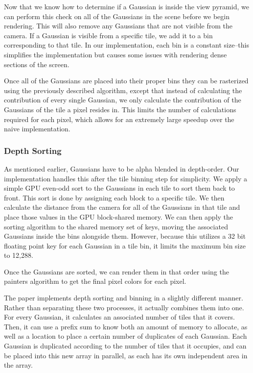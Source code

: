 \documentclass[12pt, a4paper, twocolumn]{article}
\begin{document}
Now that we know how to determine if a Gaussian is inside the view pyramid, we can perform this check on all of the Gaussians in the scene before we begin rendering. This will also remove any Gaussians that are not visible from the camera. If a Gaussian is visible from a specific tile, we add it to a bin corresponding to that tile. In our implementation, each bin is a constant size--this simplifies the implementation but causes some issues with rendering dense sections of the screen. 

Once all of the Gaussians are placed into their proper bins they can be rasterized using the previously described algorithm, except that instead of calculating the contribution of every single Gaussian, we only calculate the contribution of the Gaussians of the tile a pixel resides in. This limits the number of calculations required for each pixel, which allows for an extremely large speedup over the naive implementation.

\subsubsection{Depth Sorting}

As mentioned earlier, Gaussians have to be alpha blended in depth-order. Our implementation handles this after the tile binning step for simplicity. We apply a simple GPU even-odd sort to the Gaussians in each tile to sort them back to front. This sort is done by assigning each block to a specific tile. We then calculate the distance from the camera for all of the Gaussians in that tile and place those values in the GPU block-shared memory. We can then apply the sorting algorithm to the shared memory set of keys, moving the associated Gaussians inside the bins alongside them. However, because this utilizes a 32 bit floating point key for each Gaussian in a tile bin, it limits the maximum bin size to 12,288.

Once the Gaussians are sorted, we can render them in that order using the painters algorithm to get the final pixel colors for each pixel. 

The paper implements depth sorting and binning in a slightly different manner. Rather than separating these two processes, it actually combines them into one. For every Gaussian, it calculates an associated number of tiles that it covers. Then, it can use a prefix sum to know both an amount of memory to allocate, as well as a location to place a certain number of duplicates of each Gaussian. Each Gaussian is duplicated according to the number of tiles that it occupies, and can be placed into this new array in parallel, as each has its own independent area in the array.
\end{document}
